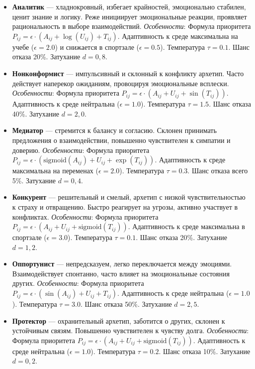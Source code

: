 \documentclass[12pt]{article}
\begin{document}
\begin{itemize}
    \item \textbf{Аналитик} — хладнокровный, избегает крайностей, эмоционально стабилен, ценит знание и логику. Реже инициирует эмоциональные реакции, проявляет рациональность в выборе взаимодействий. 
    \textit{Особенности}: Формула приоритета \(P_{ij} = \epsilon \cdot (A_{ij} + \log(U_{ij}) + T_{ij})\). Адаптивность к среде максимальна на учебе (\(\epsilon = 2.0\)) и снижается в спортзале (\(\epsilon = 0.5\)). Температура \(\tau = 0.1\). Шанс отказа 20\%. Затухание $d = 0{,}8$.
    
    \item \textbf{Нонконформист} — импульсивный и склонный к конфликту архетип. Часто действует наперекор ожиданиям, провоцируя эмоциональные всплески. 
    \textit{Особенности}: Формула приоритета \(P_{ij} = \epsilon \cdot (A_{ij} + U_{ij} + \sin(T_{ij}))\). Адаптивность к среде нейтральна (\(\epsilon = 1.0\)). Температура \(\tau = 1.5\). Шанс отказа 40\%. Затухание $d = 2{,}0$.
    
    \item \textbf{Медиатор} — стремится к балансу и согласию. Склонен принимать предложения о взаимодействии, повышенно чувствителен к симпатии и доверию. 
    \textit{Особенности}: Формула приоритета \(P_{ij} = \epsilon \cdot (\text{sigmoid}(A_{ij}) + U_{ij} + \exp(T_{ij}))\). Адаптивность к среде максимальна на переменах (\(\epsilon = 2.0\)). Температура \(\tau = 0.3\). Шанс отказа всего 5\%. Затухание $d = 0{,}4$.
    
    \item \textbf{Конкурент} — решительный и смелый, архетип с низкой чувствительностью к страху и отвращению. Быстро реагирует на угрозы, активно участвует в конфликтах. 
    \textit{Особенности}: Формула приоритета \(P_{ij} = \epsilon \cdot (A_{ij} + U_{ij} + \text{sigmoid}(T_{ij}))\). Адаптивность к среде максимальна в спортзале (\(\epsilon = 3.0\)). Температура \(\tau = 0.1\). Шанс отказа 20\%. Затухание $d = 1{,}2$.
    
    \item \textbf{Оппортунист} — непредсказуем, легко переключается между эмоциями. Взаимодействует спонтанно, часто влияет на эмоциональные состояния других. 
    \textit{Особенности}: Формула приоритета \(P_{ij} = \epsilon \cdot (\sin(A_{ij}) + U_{ij} + T_{ij})\). Адаптивность к среде нейтральна (\(\epsilon = 1.0\)). Температура \(\tau = 3.0\). Шанс отказа 50\%. Затухание $d = 2{,}5$.
    
    \item \textbf{Протектор} — охранительный архетип, заботится о других, склонен к устойчивым связям. Повышенно чувствителен к чувству долга. 
    \textit{Особенности}: Формула приоритета \(P_{ij} = \epsilon \cdot (A_{ij} + U_{ij} + \text{sigmoid}(T_{ij}))\). Адаптивность к среде нейтральна (\(\epsilon = 1.0\)). Температура \(\tau = 0.2\). Шанс отказа 10\%. Затухание $d = 0{,}2$.
    

\end{itemize}
\end{document}
